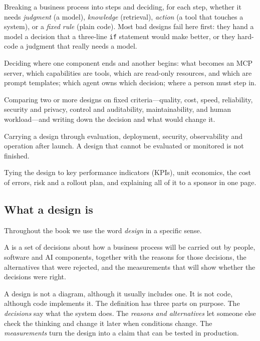 \begin{description}[leftmargin=0pt,itemsep=3pt]
  \item[Decomposition.] Breaking a business process into steps and deciding, for each step, whether it needs \emph{judgment} (a model), \emph{knowledge} (retrieval), \emph{action} (a tool that touches a system), or a \emph{fixed rule} (plain code). Most bad designs fail here first: they hand a model a decision that a three-line \texttt{if} statement would make better, or they hard-code a judgment that really needs a model.
  \item[Boundaries.] Deciding where one component ends and another begins: what becomes an MCP server, which capabilities are tools, which are read-only resources, and which are prompt templates; which agent owns which decision; where a person must step in.
  \item[Trade-offs.] Comparing two or more designs on fixed criteria---quality, cost, speed, reliability, security and privacy, control and auditability, maintainability, and human workload---and writing down the decision and what would change it.
  \item[Production.] Carrying a design through evaluation, deployment, security, observability and operation after launch. A design that cannot be evaluated or monitored is not finished.
  \item[Business justification.] Tying the design to key performance indicators (KPIs), unit economics, the cost of errors, risk and a rollout plan, and explaining all of it to a sponsor in one page.
\end{description}

\subsection{What a design is}

Throughout the book we use the word \emph{design} in a specific sense.

\begin{definition}
A  is a set of decisions about how a business process will be carried out by people, software and AI components, together with the reasons for those decisions, the alternatives that were rejected, and the measurements that will show whether the decisions were right.
\end{definition}

A design is not a diagram, although it usually includes one. It is not code, although code implements it. The definition has three parts on purpose. The \emph{decisions} say what the system does. The \emph{reasons and alternatives} let someone else check the thinking and change it later when conditions change. The \emph{measurements} turn the design into a claim that can be tested in production.

